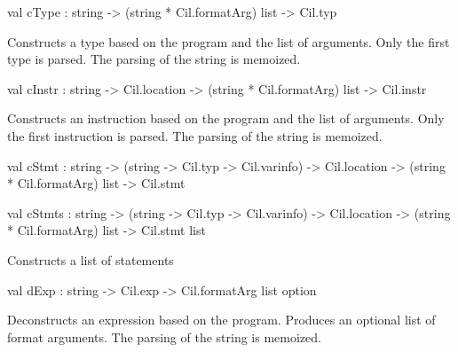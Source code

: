 \documentclass[11pt]{article}
\begin{document}
\label{val:Formatcil.cType}\begin{ocamldoccode}
val cType : string -> (string * Cil.formatArg) list -> Cil.typ
\end{ocamldoccode}
\begin{ocamldocdescription}
Constructs a type based on the program and the list of arguments. 
 Only the first type is parsed. 
 The parsing of the string is memoized.


\end{ocamldocdescription}




\label{val:Formatcil.cInstr}\begin{ocamldoccode}
val cInstr :
  string -> Cil.location -> (string * Cil.formatArg) list -> Cil.instr
\end{ocamldoccode}
\begin{ocamldocdescription}
Constructs an instruction based on the program and the list of arguments. 
 Only the first instruction is parsed. 
 The parsing of the string is memoized.


\end{ocamldocdescription}




\label{val:Formatcil.cStmt}\begin{ocamldoccode}
val cStmt :
  string ->
  (string -> Cil.typ -> Cil.varinfo) ->
  Cil.location -> (string * Cil.formatArg) list -> Cil.stmt
\end{ocamldoccode}




\label{val:Formatcil.cStmts}\begin{ocamldoccode}
val cStmts :
  string ->
  (string -> Cil.typ -> Cil.varinfo) ->
  Cil.location -> (string * Cil.formatArg) list -> Cil.stmt list
\end{ocamldoccode}
\begin{ocamldocdescription}
Constructs a list of statements


\end{ocamldocdescription}




\label{val:Formatcil.dExp}\begin{ocamldoccode}
val dExp : string -> Cil.exp -> Cil.formatArg list option
\end{ocamldoccode}
\begin{ocamldocdescription}
Deconstructs an expression based on the program. Produces an optional 
 list of format arguments. The parsing of the string is memoized.


\end{ocamldocdescription}
\end{document}
